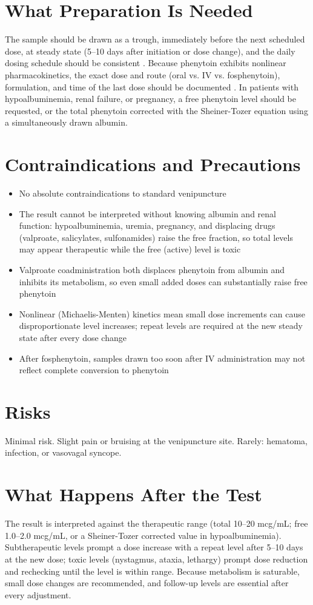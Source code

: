 \section*{What Preparation Is Needed}
The sample should be drawn as a trough, immediately before the next scheduled dose, at steady state (5--10 days after initiation or dose change), and the daily dosing schedule should be consistent \cite{patsalos2008}. Because phenytoin exhibits nonlinear pharmacokinetics, the exact dose and route (oral vs. IV vs. fosphenytoin), formulation, and time of the last dose should be documented \cite{patsalos2013saliva}. In patients with hypoalbuminemia, renal failure, or pregnancy, a free phenytoin level should be requested, or the total phenytoin corrected with the Sheiner-Tozer equation using a simultaneously drawn albumin.

\section*{Contraindications and Precautions}
\begin{itemize}
  \item No absolute contraindications to standard venipuncture
  \item The result cannot be interpreted without knowing albumin and renal function: hypoalbuminemia, uremia, pregnancy, and displacing drugs (valproate, salicylates, sulfonamides) raise the free fraction, so total levels may appear therapeutic while the free (active) level is toxic
  \item Valproate coadministration both displaces phenytoin from albumin and inhibits its metabolism, so even small added doses can substantially raise free phenytoin
  \item Nonlinear (Michaelis-Menten) kinetics mean small dose increments can cause disproportionate level increases; repeat levels are required at the new steady state after every dose change
  \item After fosphenytoin, samples drawn too soon after IV administration may not reflect complete conversion to phenytoin
\end{itemize}

\section*{Risks}
Minimal risk. Slight pain or bruising at the venipuncture site. Rarely: hematoma, infection, or vasovagal syncope.

\section*{What Happens After the Test}
The result is interpreted against the therapeutic range (total 10--20 mcg/mL; free 1.0--2.0 mcg/mL, or a Sheiner-Tozer corrected value in hypoalbuminemia). Subtherapeutic levels prompt a dose increase with a repeat level after 5--10 days at the new dose; toxic levels (nystagmus, ataxia, lethargy) prompt dose reduction and rechecking until the level is within range. Because metabolism is saturable, small dose changes are recommended, and follow-up levels are essential after every adjustment.

